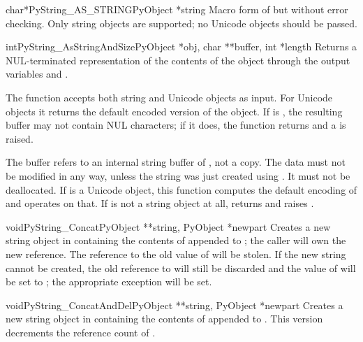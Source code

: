 \begin{cfuncdesc}{char*}{PyString_AS_STRING}{PyObject *string}
  Macro form of  but without error
  checking.  Only string objects are supported; no Unicode objects
  should be passed.
\end{cfuncdesc}

\begin{cfuncdesc}{int}{PyString_AsStringAndSize}{PyObject *obj,
                                                 char **buffer,
                                                 int *length}
  Returns a NUL-terminated representation of the contents of the
  object  through the output variables  and
  .

  The function accepts both string and Unicode objects as input. For
  Unicode objects it returns the default encoded version of the
  object.  If  is \NULL{}, the resulting buffer may not
  contain NUL characters; if it does, the function returns 
  and a  is raised.

  The buffer refers to an internal string buffer of , not a
  copy. The data must not be modified in any way, unless the string
  was just created using .  It must not be deallocated.  If  is a
  Unicode object, this function computes the default encoding of
   and operates on that.  If  is not a string
  object at all,  returns \NULL{} and
  raises .
\end{cfuncdesc}

\begin{cfuncdesc}{void}{PyString_Concat}{PyObject **string,
                                         PyObject *newpart}
  Creates a new string object in  containing the contents
  of  appended to ; the caller will own the
  new reference.  The reference to the old value of  will
  be stolen.  If the new string cannot be created, the old reference
  to  will still be discarded and the value of
   will be set to \NULL{}; the appropriate exception will
  be set.
\end{cfuncdesc}

\begin{cfuncdesc}{void}{PyString_ConcatAndDel}{PyObject **string,
                                               PyObject *newpart}
  Creates a new string object in  containing the contents
  of  appended to .  This version decrements
  the reference count of .
\end{cfuncdesc}

